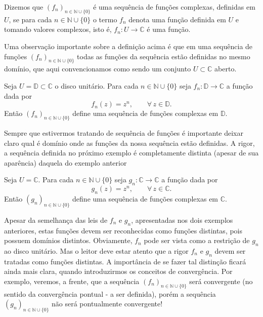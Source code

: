 \begin{definicao}
Dizemos que $(f_n)_{n\in\mathbb{N}\cup\{0\}}$ 
é uma sequência de funções complexas, definidas em $U$, se
para cada $n\in\mathbb{N}\cup\{0\}$ o termo $f_n$ denota uma 
função definida em $U$ e tomando valores complexos, isto é,  
$f_n:U\to\mathbb{C}$ é uma função.
\end{definicao}

Uma observação importante sobre a definição acima é que em uma sequência
de funções $(f_n)_{n\in\mathbb{N}\cup\{0\}}$ todas as funções da sequência 
estão definidas no mesmo domínio, que aqui convencionamos como sendo um conjunto 
$U\subset \mathbb{C}$ aberto. 

\begin{exemplo}\label{exemplo-seq-func-disco}
Seja $U=\mathbb{D}\subset\mathbb{C}$ o disco unitário. Para cada $n\in\mathbb{N}\cup\{0\}$
seja $f_n:\mathbb{D}\to\mathbb{C}$ a função dada por
\[
f_n(z) = z^n, \qquad \forall\, z\in\mathbb{D}.
\]
Então $(f_n)_{n\in\mathbb{N}\cup\{0\}}$ define uma sequência de funções complexas 
em $\mathbb{D}$.
\end{exemplo}

Sempre que estivermos tratando de sequência de funções é importante deixar claro 
qual é domínio onde as funções da nossa sequência estão definidas. A rigor, a
sequência definida no próximo exemplo é completamente distinta (apesar de sua aparência)
daquela do exemplo anterior

\begin{exemplo}\label{exemplo-seq-func-plano}
Seja $U=\mathbb{C}$. Para cada $n\in\mathbb{N}\cup\{0\}$
seja $g_n:\mathbb{C}\to\mathbb{C}$ a função dada por
\[
g_n(z) = z^n, \qquad \forall\, z\in\mathbb{C }.
\]
Então $(g_n)_{n\in\mathbb{N}\cup\{0\}}$ define uma sequência de funções complexas 
em $\mathbb{C}$.
\end{exemplo}

Apesar da semelhança das leis de $f_n$ e $g_n$, 
apresentadas nos dois exemplos anteriores, 
estas funções devem ser reconhecidas como funções distintas, 
pois possuem domínios distintos. 
Obviamente, $f_n$ pode ser vista 
como a restrição de $g_n$ ao disco unitário. Mas o leitor deve estar atento
que a rigor $f_n$ e $g_n$ devem ser tratadas como funções distintas.
A importância de se fazer tal distinção ficará ainda mais clara, quando introduzirmos 
os conceitos de convergência. Por exemplo, veremos, a frente, que a sequência 
$(f_n)_{n\in\mathbb{N}\cup\{0\}}$ será convergente (no sentido da convergência pontual - a ser definida), porém a sequência $(g_n)_{n\in\mathbb{N}\cup\{0\}}$ não será pontualmente convergente!


